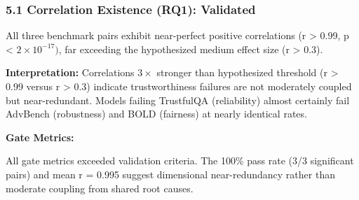 
\subsubsection{5.1 Correlation Existence (RQ1): Validated}

All three benchmark pairs exhibit near-perfect positive correlations (r > 0.99, p < $2\times 10^{-17})$, far exceeding the hypothesized medium effect size (r > 0.3).

\begin{table}[htbp]
\centering
{}
\end{table}

\textbf{Interpretation:} Correlations $3\times$ stronger than hypothesized threshold (r > 0.99 versus r > 0.3) indicate trustworthiness failures are not moderately coupled but near-redundant. Models failing TrustfulQA (reliability) almost certainly fail AdvBench (robustness) and BOLD (fairness) at nearly identical rates.

\textbf{Gate Metrics:}

\begin{table}[htbp]
\centering
{}
\end{table}

All gate metrics exceeded validation criteria. The 100\% pass rate (3/3 significant pairs) and mean r = 0.995 suggest dimensional near-redundancy rather than moderate coupling from shared root causes.

